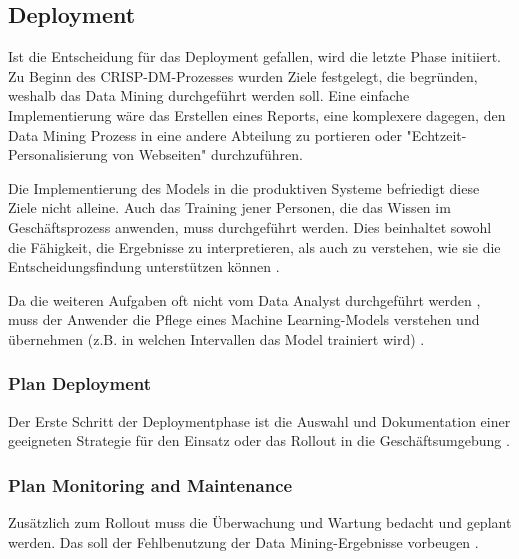 \subsection{Deployment}
Ist die Entscheidung für das Deployment gefallen, wird die letzte Phase initiiert. Zu Beginn des CRISP-DM-Prozesses wurden Ziele festgelegt, die begründen, weshalb das Data Mining durchgeführt werden soll. 
Eine einfache Implementierung wäre das Erstellen eines Reports, eine komplexere dagegen, den Data Mining Prozess in eine andere Abteilung zu portieren\citep[Punkte 1.4.1.6.b und c]{larose_discovering_2014} oder "Echtzeit-Personalisierung von Webseiten"\citep[S.~18; eigene Übersetzung]{shearer_crisp-dm_2000} durchzuführen.\par
Die Implementierung des Models in die produktiven Systeme befriedigt diese Ziele nicht alleine. Auch das Training jener Personen, die das Wissen im Geschäftsprozess anwenden, muss durchgeführt werden. Dies beinhaltet sowohl die Fähigkeit, die Ergebnisse zu interpretieren, als auch zu verstehen, wie sie die Entscheidungsfindung unterstützen können \citep[S.~73]{swamynathan_mastering_2017}. \par
Da die weiteren Aufgaben oft nicht vom Data Analyst durchgeführt werden \citep[Punkt 1.4.1.6.d]{larose_discovering_2014}, muss der Anwender die Pflege eines Machine Learning-Models verstehen und übernehmen (z.B. in welchen Intervallen das Model trainiert wird) \citep[S.~74]{swamynathan_mastering_2017}.

\subsubsection{Plan Deployment}
Der Erste Schritt der Deploymentphase ist die Auswahl und Dokumentation einer geeigneten Strategie für den Einsatz oder das Rollout in die Geschäftsumgebung .

\subsubsection{Plan Monitoring and Maintenance}
Zusätzlich zum Rollout muss die Überwachung und Wartung bedacht und geplant werden. Das soll der Fehlbenutzung der Data Mining-Ergebnisse vorbeugen .

